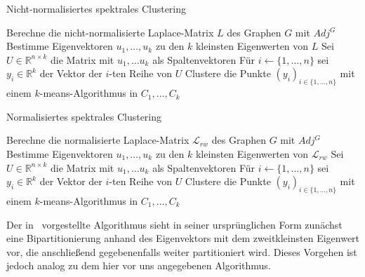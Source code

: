 \begin{algorithm}
\caption{Nicht-normalisiertes spektrales Clustering~\cite{Luxburg07}}
\label{algo:non-normalized-spectral-clustering}
	\DontPrintSemicolon
	
	\BlankLine
	
	Berechne die nicht-normalisierte Laplace-Matrix $L$ des Graphen $G$ mit $Adj^G$\;
	Bestimme Eigenvektoren $u_1, \dots, u_k$ zu den $k$ kleinsten Eigenwerten von $L$\;
	Sei $U \in \mathbb{R}^{n \times k}$ die Matrix mit $u_1, \dots u_k$ als Spaltenvektoren\;
	Für $i \leftarrow \{ 1, \dots, n \}$ sei $y_i \in \mathbb{R}^k$ der Vektor der $i$-ten Reihe von $U$\;
	Clustere die Punkte $(y_i)_{i \in \{1, \dots, n\}}$ mit einem $k$-means-Algorithmus in $C_1, \dots, C_k$
\end{algorithm}

\begin{algorithm}
\caption{Normalisiertes spektrales Clustering~\cite{ShiM00}}
\label{algo:normalized-spectral-clustering-shi-malik}
	\DontPrintSemicolon
	
	\BlankLine
	
	Berechne die normalisierte Laplace-Matrix $\mathcal{L}_{rw}$ des Graphen $G$ mit $Adj^G$\;
	Bestimme Eigenvektoren $u_1, \dots, u_k$ zu den $k$ kleinsten Eigenwerten von $\mathcal{L}_{rw}$\;
	Sei $U \in \mathbb{R}^{n \times k}$ die Matrix mit $u_1, \dots u_k$ als Spaltenvektoren\;
	Für $i \leftarrow \{ 1, \dots, n \}$ sei $y_i \in \mathbb{R}^k$ der Vektor der $i$-ten Reihe von $U$\;
	Clustere die Punkte $(y_i)_{i \in \{1, \dots, n\}}$ mit einem $k$-means-Algorithmus in $C_1, \dots, C_k$
\end{algorithm}
Der in~\cite{ShiM00} vorgestellte Algorithmus sieht in seiner ursprünglichen Form zunächst eine Bipartitionierung anhand des
Eigenvektors mit dem zweitkleinsten Eigenwert vor,
die anschließend gegebenenfalls weiter partitioniert wird. Dieses Vorgehen ist jedoch analog zu dem hier vor uns angegebenen
Algorithmus.

